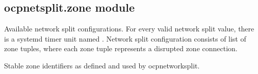\documentclass[letterpaper,10pt,english]{sphinxmanual}
\begin{document}
\subsection{ocpnetsplit.zone module}
\label{\detokenize{ocpnetsplit:module-ocpnetsplit.zone}}\label{\detokenize{ocpnetsplit:ocpnetsplit-zone-module}}

\begin{fulllineitems}
\label{\detokenize{ocpnetsplit:ocpnetsplit.zone.NETWORK_SPLITS}}
Available network split configurations. For every valid network split value,
there is a systemd timer unit named .
Network split configuration consists of list of zone tuples, where each zone
tuple represents a disrupted zone connection.

\end{fulllineitems}


\begin{fulllineitems}
\label{\detokenize{ocpnetsplit:ocpnetsplit.zone.ZONES}}
Stable zone identifiers as defined and used by ocp\sphinxhyphen{}network\sphinxhyphen{}split.

\end{fulllineitems}

\end{document}
